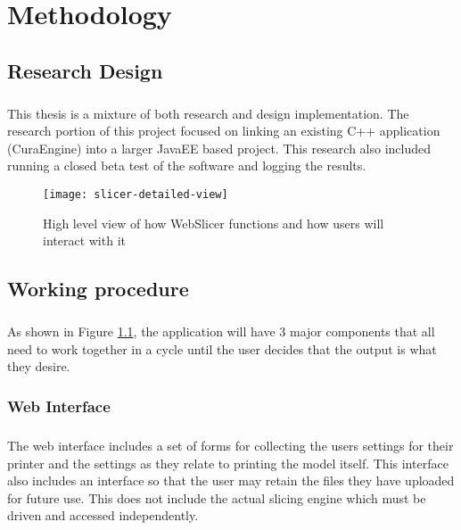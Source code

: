 \chapter{Methodology}

\section{Research Design} 
\paragraph{}
This thesis is a mixture of both research and design implementation.
The research portion of this project focused on linking an existing C++ application (CuraEngine) into a larger JavaEE based project.
This research also included running a closed beta test of the software and logging the results.

\begin{figure}[!ht]
  \centering
  \texttt{[image: slicer-detailed-view]}
  \caption{High level view of how WebSlicer functions and how users will interact with it}
  \label{fig:slicer-detailed-view}
\end{figure}

\section{Working procedure}
\paragraph{}
As shown in Figure \ref{fig:slicer-detailed-view}, the application will have 3 major components that all need to work together in a cycle until the user decides that the output is what they desire.

\subsection{Web Interface}
\paragraph{}
The web interface includes a set of forms for collecting the users settings for their printer and the settings as they relate to printing the model itself.
This interface also includes an interface so that the user may retain the files they have uploaded for future use.
This does not include the actual slicing engine which must be driven and accessed independently.

